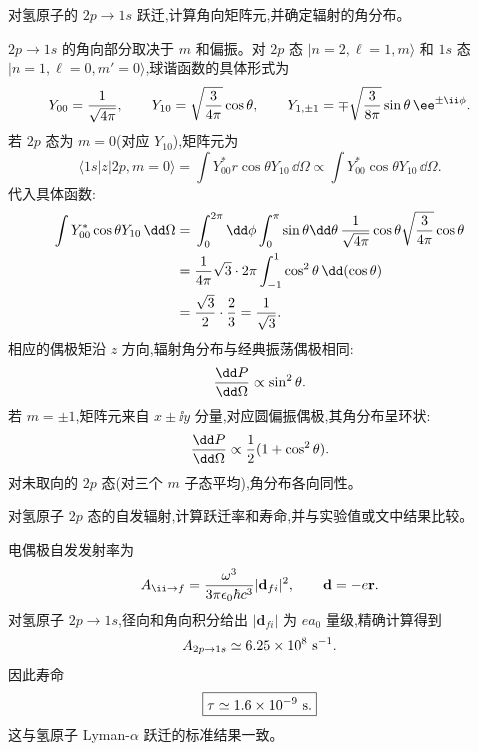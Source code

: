 \begin{question}
对氢原子的 $2p\to1s$ 跃迁,计算角向矩阵元,并确定辐射的角分布。
\begin{solution}
$2p\to1s$ 的角向部分取决于 $m$ 和偏振。对 $2p$ 态 $|n=2,\ell=1,m\rangle$ 和 $1s$ 态 $|n=1,\ell=0,m'=0\rangle$,球谐函数的具体形式为
\[
Y_{00}={1\over\sqrt{4\pi}},\qquad
Y_{10}=\sqrt{3\over4\pi}\cos\theta,\qquad
Y_{1,\pm1}=\mp\sqrt{3\over8\pi}\sin\theta\,\ee^{\pm\ii\phi}.
\]
若 $2p$ 态为 $m=0$(对应 $Y_{10}$),矩阵元为
\[
\langle1s|z|2p,m=0\rangle
=\int Y_{00}^* r\cos\theta Y_{10}\,\dd\Omega
\propto\int Y_{00}^*\cos\theta Y_{10}\,\dd\Omega.
\]
代入具体函数:
\[
\begin{aligned}\int Y_{00}^*\cos\theta Y_{10}\,\dd\Omega={}&\int_0^{2\pi}\dd\phi\int_0^\pi\sin\theta\dd\theta\,{1\over\sqrt{4\pi}}\cos\theta\sqrt{3\over4\pi}\cos\theta\\={}&{1\over4\pi}\sqrt3\cdot2\pi\int_{-1}^{1}\cos^2\theta\,\dd(\cos\theta)\\={}&{\sqrt3\over2}\cdot{2\over3}={1\over\sqrt3}.\end{aligned}
\]
相应的偶极矩沿 $z$ 方向,辐射角分布与经典振荡偶极相同:
\[
{\dd P\over\dd\Omega}\propto\sin^2\theta.
\]
若 $m=\pm1$,矩阵元来自 $x\pm\ii y$ 分量,对应圆偏振偶极,其角分布呈环状:
\[
{\dd P\over\dd\Omega}\propto{1\over2}(1+\cos^2\theta).
\]
对未取向的 $2p$ 态(对三个 $m$ 子态平均),角分布各向同性。
\end{solution}
\end{question}

\begin{question}
对氢原子 $2p$ 态的自发辐射,计算跃迁率和寿命,并与实验值或文中结果比较。
\begin{solution}
电偶极自发发射率为
\[
A_{\ii\to f}={\omega^3\over3\pi\epsilon_0\hbar c^3}|\mathbf d_{fi}|^2,
\qquad \mathbf d=-e\mathbf r.
\]
对氢原子 $2p\to1s$,径向和角向积分给出 $|\mathbf d_{fi}|$ 为 $ea_0$ 量级,精确计算得到
\[
A_{2p\to1s}\simeq 6.25\times10^8\ {\rm s}^{-1}.
\]
因此寿命
\[
\boxed{\tau\simeq1.6\times10^{-9}\ {\rm s}.}
\]
这与氢原子 Lyman-$\alpha$ 跃迁的标准结果一致。
\end{solution}
\end{question}

